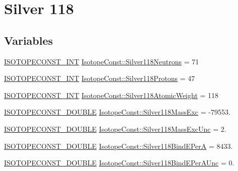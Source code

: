\hypertarget{group___isotope_const-_silver-_ag118}{}\section{Silver 118}
\label{group___isotope_const-_silver-_ag118}
\subsection*{Variables}
\begin{DoxyCompactItemize}
\item 
\mbox{\hyperlink{group___isotope_const-_macros_ga5f18360b3e99483a35c32d789e62621c}{I\+S\+O\+T\+O\+P\+E\+C\+O\+N\+S\+T\+\_\+\+I\+NT}} \mbox{\hyperlink{group___isotope_const-_silver-_ag118_ga5b0e595282b94575b5a8c461bd27284b}{Isotope\+Const\+::\+Silver118\+Neutrons}} = 71
\item 
\mbox{\hyperlink{group___isotope_const-_macros_ga5f18360b3e99483a35c32d789e62621c}{I\+S\+O\+T\+O\+P\+E\+C\+O\+N\+S\+T\+\_\+\+I\+NT}} \mbox{\hyperlink{group___isotope_const-_silver-_ag118_ga4256429dadde7c7f160ce1fb7ac1a530}{Isotope\+Const\+::\+Silver118\+Protons}} = 47
\item 
\mbox{\hyperlink{group___isotope_const-_macros_ga5f18360b3e99483a35c32d789e62621c}{I\+S\+O\+T\+O\+P\+E\+C\+O\+N\+S\+T\+\_\+\+I\+NT}} \mbox{\hyperlink{group___isotope_const-_silver-_ag118_ga196e399723c71ad761a9649eabfd4225}{Isotope\+Const\+::\+Silver118\+Atomic\+Weight}} = 118
\item 
\mbox{\hyperlink{group___isotope_const-_macros_ga8f45a7272ce02c0b4c65c44636ed719a}{I\+S\+O\+T\+O\+P\+E\+C\+O\+N\+S\+T\+\_\+\+D\+O\+U\+B\+LE}} \mbox{\hyperlink{group___isotope_const-_silver-_ag118_gab5717cb1820d49f1d74b11f8ef189685}{Isotope\+Const\+::\+Silver118\+Mass\+Exc}} = -\/79553.
\item 
\mbox{\hyperlink{group___isotope_const-_macros_ga8f45a7272ce02c0b4c65c44636ed719a}{I\+S\+O\+T\+O\+P\+E\+C\+O\+N\+S\+T\+\_\+\+D\+O\+U\+B\+LE}} \mbox{\hyperlink{group___isotope_const-_silver-_ag118_ga62815fe4bf750348977bfcbafc3164d9}{Isotope\+Const\+::\+Silver118\+Mass\+Exc\+Unc}} = 2.
\item 
\mbox{\hyperlink{group___isotope_const-_macros_ga8f45a7272ce02c0b4c65c44636ed719a}{I\+S\+O\+T\+O\+P\+E\+C\+O\+N\+S\+T\+\_\+\+D\+O\+U\+B\+LE}} \mbox{\hyperlink{group___isotope_const-_silver-_ag118_ga17900c9a94f0bb8eed6727a47da7f7df}{Isotope\+Const\+::\+Silver118\+Bind\+E\+PerA}} = 8433.
\item 
\mbox{\hyperlink{group___isotope_const-_macros_ga8f45a7272ce02c0b4c65c44636ed719a}{I\+S\+O\+T\+O\+P\+E\+C\+O\+N\+S\+T\+\_\+\+D\+O\+U\+B\+LE}} \mbox{\hyperlink{group___isotope_const-_silver-_ag118_ga9e5604207a4ea553257f6607ac1919e6}{Isotope\+Const\+::\+Silver118\+Bind\+E\+Per\+A\+Unc}} = 0.

\end{DoxyCompactItemize}
